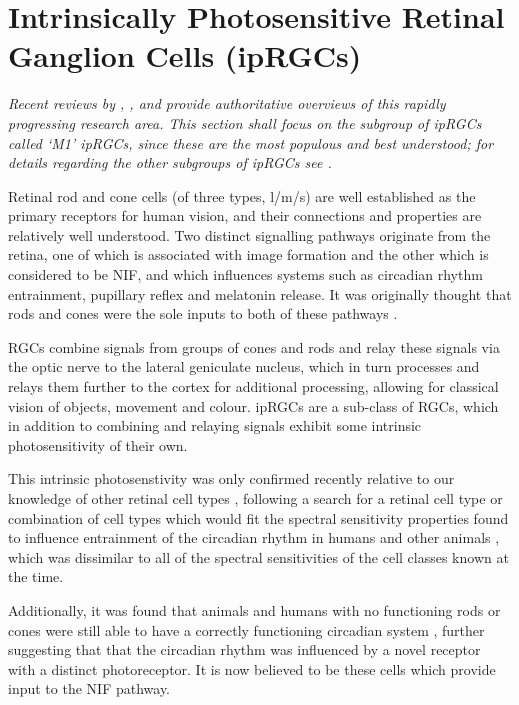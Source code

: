 \section{Intrinsically Photosensitive Retinal Ganglion Cells (ipRGCs)}

\textit{Recent reviews by \citet{spitschan_melanopsin_2019}, \citet{do_melanopsin_2019},\citet{graham_melanopsin-expressing_2016} and \citet{lucas_melanopsin_2015} provide authoritative overviews of this rapidly progressing research area. This section shall focus on the subgroup of \glspl{ipRGC} called `M1' \glspl{ipRGC}, since these are the most populous and best understood; for details regarding the other subgroups of \glspl{ipRGC} see \citet{ecker_melanopsin-expressing_2010}.}

\bigskip

Retinal rod and cone cells (of three types, l/m/s) are well established as the primary receptors for human vision, and their connections and properties are relatively well understood. Two distinct signalling pathways originate from the retina, one of which is associated with image formation and the other which is considered to be \gls{NIF}, and which influences systems such as circadian rhythm entrainment, pupillary reflex and melatonin release. It was originally thought that rods and cones were the sole inputs to both of these pathways \citep{hankins_melanopsin_2008}.

\Glspl{RGC} combine signals from groups of cones and rods and relay these signals via the optic nerve to the lateral geniculate nucleus, which in turn processes and relays them further to the cortex for additional processing, allowing for classical vision of objects, movement and colour. \Glspl{ipRGC} are a sub-class of \glspl{RGC}, which in addition to combining and relaying signals exhibit some intrinsic photosensitivity of their own. 

This intrinsic photosenstivity was only confirmed recently relative to our knowledge of other retinal cell types \citep{qiu_induction_2005}, following a search for a retinal cell type or combination of cell types which would fit the spectral sensitivity properties found to influence entrainment of the circadian rhythm in humans and other animals \citep{brainard_human_2001,brainard_action_2001}, which was dissimilar to all of the spectral sensitivities of the cell classes known at the time.

Additionally, it was found that animals and humans with no functioning rods or cones were still able to have a correctly functioning circadian system \citep{freedman_regulation_1999,zaidi_short-wavelength_2007}, further suggesting that that the circadian rhythm was influenced by a novel receptor with a distinct photoreceptor. It is now believed to be these cells which provide input to the \gls{NIF} pathway.

